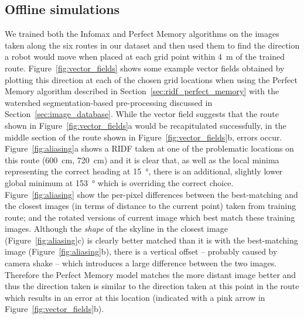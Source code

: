 \documentclass[letterpaper]{article}
\begin{document}
\subsection{Offline simulations}
\label{sec:offline_simulations}
We trained both the Infomax and Perfect Memory algorithms on the images taken along the six routes in our dataset and then used them to find the direction a robot would move when placed at each grid point within \SI{4}{\metre} of the trained route. 
Figure~\ref{fig:vector_fields} shows some example vector fields obtained by plotting this direction at each of the chosen grid locations when using the Perfect Memory algorithm described in Section~\ref{sec:ridf_perfect_memory} with the watershed segmentation-based pre-processing discussed in Section~\ref{sec:image_database}. 
While the vector field suggests that the route shown in Figure~\ref{fig:vector_fields}a would be recapitulated successfully, in the middle section of the route shown in Figure~\ref{fig:vector_fields}b, errors occur.
Figure~\ref{fig:aliasing}a shows a RIDF taken at one of the problematic locations on this route (\SI{600}{\centi\metre}, \SI{720}{\centi\metre}) and it is clear that, as well as the local minima representing the correct heading at \SI{15}{\degree}, there is an additional, slightly lower global minimum at \SI{153}{\degree} which is overriding the correct choice.
Figure~\ref{fig:aliasing} show the per-pixel differences between the best-matching and the closest images (in terms of distance to the current point) taken from training route; and the rotated versions of current image which best match these training images.
Although the \emph{shape} of the skyline in the closest image (Figure~\ref{fig:aliasing}c) is clearly better matched than it is with the best-matching image (Figure~\ref{fig:aliasing}b), there is a vertical offset -- probably caused by camera shake -- which introduces a large difference between the two images.
Therefore the Perfect Memory model matches the more distant image better and thus the direction taken is similar to the direction taken at this point in the route which results in an error at this location (indicated with a pink arrow in Figure~\ref{fig:vector_fields}b).
\end{document}

